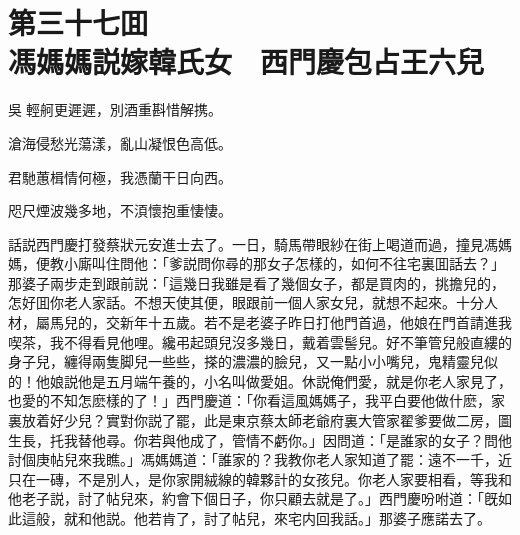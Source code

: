 
\chapter*{第三十七囬　\\馮媽媽説嫁韓氏女　西門慶包占王六兒}


\begin{myquote}
吳𦨻輕舸更遲遲，別酒重斟惜解携。

滄海侵愁光蕩漾，亂山凝恨色高低。

君馳蕙楫情何極，我憑蘭干日向西。

咫尺煙波幾多地，不湏懷抱重悽悽。
\end{myquote}

話説西門慶打發蔡狀元安進士去了。一日，騎馬帶眼紗在街上喝道而過，撞見馮媽媽，便教小廝叫住問他：「爹説問你尋的那女子怎樣的，如何不往宅裏囬話去？」那婆子兩步走到跟前説：「這幾日我雖是看了幾個女子，都是買肉的，挑擔兒的，怎好囬你老人家話。不想天使其便，眼跟前一個人家女兒，就想不起來。十分人材，屬馬兒的，交新年十五歲。若不是老婆子昨日打他門首過，他娘在門首請進我喫茶，我不得看見他哩。纔弔起頭兒沒多幾日，戴着雲髻兒。好不筆管兒般直縷的身子兒，纏得兩隻脚兒一些些，搽的濃濃的臉兒，又一點小小嘴兒，鬼精靈兒似的！他娘説他是五月端午養的，小名叫做愛姐。休説俺們愛，就是你老人家見了，也愛的不知怎麽樣的了！」西門慶道：「你看這風媽媽子，我平白要他做什麽，家裏放着好少兒？實對你説了罷，此是東京蔡太師老爺府裏大管家翟爹要做二房，圖生長，托我替他尋。你若與他成了，管情不虧你。」因問道：「是誰家的女子？問他討個庚帖兒來我瞧。」馮媽媽道：「誰家的？我教你老人家知道了罷：遠不一千，近只在一磚，不是別人，是你家開絨線的韓夥計的女孩兒。你老人家要相看，等我和他老子説，討了帖兒來，約會下個日子，你只顧去就是了。」西門慶吩咐道：「旣如此這般，就和他説。他若肯了，討了帖兒，來宅内回我話。」那婆子應諾去了。

